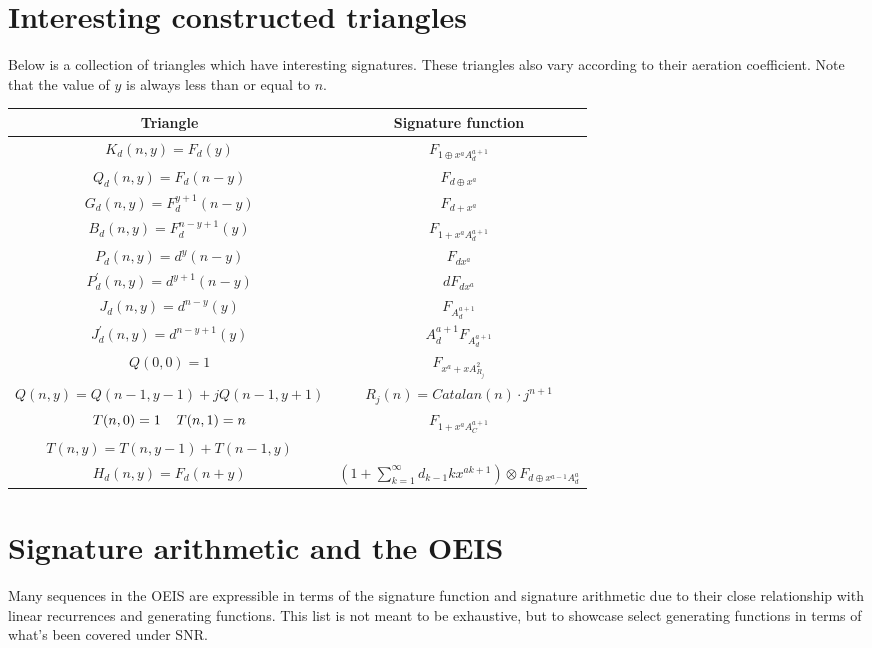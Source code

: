 \documentclass{article}
\begin{document}
\pagebreak

\section{Interesting constructed triangles}

Below is a collection of triangles which have interesting signatures. These triangles also vary according to their aeration coefficient. Note that the value of $y$ is always less than or equal to $n$.

\begin{center}
\begin{tabular}{|c|c|}
\hline
Triangle & Signature function\\
\hline
$K_d (n, y) = F_d(y)$  & $F_{1 \oplus x^a A_d^{a+1}}$\\
\hline
$Q_d (n, y) = F_d(n-y)$ & $F_{d \oplus x^a}$\\
\hline
$G_d(n, y) = F_d^{y+1} (n-y)$ & $F_{d + x^{a}}$\\
\hline
$B_d(n, y) = F_d^{n-y+1}(y)$ & $F_{1 + x^{a}A_d^{a+1}}$\\
\hline
$P_d(n, y) = d^y(n-y)$ & $F_{dx^a}$\\
\hline
$P_d^{\prime}(n, y) = d^{y+1}(n-y)$ & $dF_{d x^a}$\\
\hline
$J_d(n, y) = d^{n-y}(y)$ & $F_{A_d^{a+1}}$\\
\hline
$J_d^{\prime}(n, y) = d^{n-y+1}(y)$ & $A_d^{a+1} F_{A_d^{a+1}}$\\
\hline
$Q(0, 0) = 1$ & $F_{x^a + xA_{R_j}^2}$\\
$Q(n, y) = Q(n-1, y-1) + jQ(n-1, y+1)$ & $R_j(n) = Catalan(n) \cdot j^{n+1}$\\
\hline
$T(n, 0) = 1 \hspace{4mm} T(n, 1) = n$ & $F_{1 + x^a A_C^{a+1}}$\\
$T(n, y) = T(n,y-1) + T(n-1, y)$ &\\
\hline
$H_d (n, y) = F_d(n+y)$ & $\left(1 + \sum_{k=1}^{\infty} d_{k-1} k x^{ak+1} \right) \otimes F_{d \oplus x^{a-1}A_d^{a}}$\\
\hline
\end{tabular}
\end{center}

\pagebreak

\section{Signature arithmetic and the OEIS}

Many sequences in the OEIS are expressible in terms of the signature function and signature arithmetic due to their close relationship with linear recurrences and generating functions. This list is not meant to be exhaustive, but to showcase select generating functions in terms of what's been covered under SNR.
\end{document}
